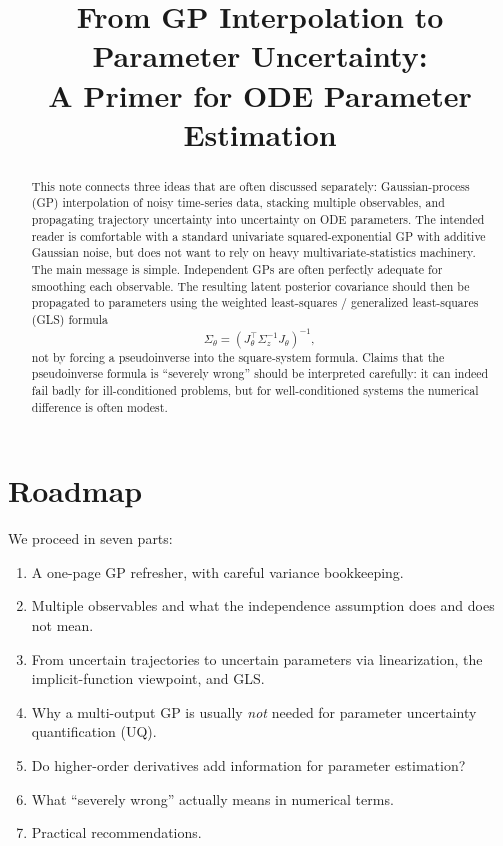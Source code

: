 \documentclass[11pt]{article}
\title{From GP Interpolation to Parameter Uncertainty:\\A Primer for ODE Parameter Estimation}
\author{}
\date{}
\begin{document}
\maketitle

\begin{abstract}
This note connects three ideas that are often discussed separately: Gaussian-process (GP) interpolation of noisy time-series data, stacking multiple observables, and propagating trajectory uncertainty into uncertainty on ODE parameters. The intended reader is comfortable with a standard univariate squared-exponential GP with additive Gaussian noise, but does not want to rely on heavy multivariate-statistics machinery. The main message is simple. Independent GPs are often perfectly adequate for smoothing each observable. The resulting latent posterior covariance should then be propagated to parameters using the weighted least-squares / generalized least-squares (GLS) formula
\[
\Sigma_\theta = (J_\theta^\top \Sigma_z^{-1} J_\theta)^{-1},
\]
not by forcing a pseudoinverse into the square-system formula. Claims that the pseudoinverse formula is ``severely wrong'' should be interpreted carefully: it can indeed fail badly for ill-conditioned problems, but for well-conditioned systems the numerical difference is often modest.
\end{abstract}

\section*{Roadmap}
We proceed in seven parts:
\begin{enumerate}
    \item A one-page GP refresher, with careful variance bookkeeping.
    \item Multiple observables and what the independence assumption does and does not mean.
    \item From uncertain trajectories to uncertain parameters via linearization, the implicit-function viewpoint, and GLS.
    \item Why a multi-output GP is usually \emph{not} needed for parameter uncertainty quantification (UQ).
    \item Do higher-order derivatives add information for parameter estimation?
    \item What ``severely wrong'' actually means in numerical terms.
    \item Practical recommendations.
\end{enumerate}
\end{document}
